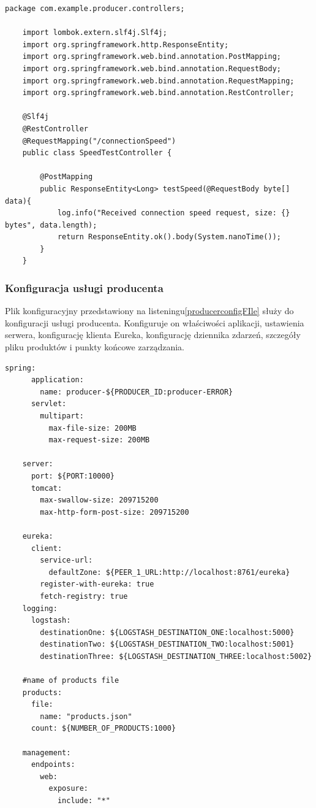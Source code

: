 \begin{lstlisting}[caption=Kod klasy SpeedTestController, label=speedTestControllerCode]
    package com.example.producer.controllers;

    import lombok.extern.slf4j.Slf4j;
    import org.springframework.http.ResponseEntity;
    import org.springframework.web.bind.annotation.PostMapping;
    import org.springframework.web.bind.annotation.RequestBody;
    import org.springframework.web.bind.annotation.RequestMapping;
    import org.springframework.web.bind.annotation.RestController;
    
    @Slf4j
    @RestController
    @RequestMapping("/connectionSpeed")
    public class SpeedTestController {
    
        @PostMapping
        public ResponseEntity<Long> testSpeed(@RequestBody byte[] data){
            log.info("Received connection speed request, size: {} bytes", data.length);
            return ResponseEntity.ok().body(System.nanoTime());
        }
    }
\end{lstlisting}

\subsubsection{Konfiguracja usługi producenta}

Plik konfiguracyjny przedstawiony na listeningu\ref{producerconfigFIle} służy do konfiguracji usługi producenta. Konfiguruje on właściwości aplikacji, ustawienia serwera, konfigurację klienta Eureka, konfigurację dziennika zdarzeń, szczegóły pliku produktów i punkty końcowe zarządzania.

\begin{lstlisting}[caption=Plik konfiguracyjny usługi producenta, label=producerconfigFIle]
    spring:
      application:
        name: producer-${PRODUCER_ID:producer-ERROR}
      servlet:
        multipart:
          max-file-size: 200MB
          max-request-size: 200MB
    
    server:
      port: ${PORT:10000}
      tomcat:
        max-swallow-size: 209715200
        max-http-form-post-size: 209715200
    
    eureka:
      client:
        service-url:
          defaultZone: ${PEER_1_URL:http://localhost:8761/eureka}
        register-with-eureka: true
        fetch-registry: true
    logging:
      logstash:
        destinationOne: ${LOGSTASH_DESTINATION_ONE:localhost:5000}
        destinationTwo: ${LOGSTASH_DESTINATION_TWO:localhost:5001}
        destinationThree: ${LOGSTASH_DESTINATION_THREE:localhost:5002}
    
    #name of products file
    products:
      file:
        name: "products.json"
      count: ${NUMBER_OF_PRODUCTS:1000}
    
    management:
      endpoints:
        web:
          exposure:
            include: "*"
\end{lstlisting}

